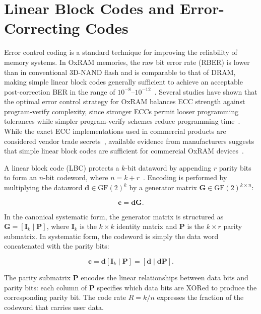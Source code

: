 \section{Linear Block Codes and Error-Correcting Codes}
\label{sec:bg-ecc}

Error control coding is a standard technique for improving the
reliability of memory systems. In OxRAM memories, the raw bit error rate
(RBER) is lower than in conventional 3D-NAND flash and is comparable to
that of DRAM, making simple linear block codes generally sufficient to
achieve an acceptable post-correction BER in the range of
$10^{-8}$--$10^{-12}$~\cite{patel2020bit}. Several studies have shown
that the optimal error control strategy for OxRAM balances ECC strength
against program-verify complexity, since stronger ECCs permit looser
programming tolerances while simpler program-verify schemes reduce
programming time~\cite{hayakawa2017resolving,
	fukuyama2019comprehensive}. While the exact ECC implementations used in
commercial products are considered vendor trade
secrets~\cite{patel2020bit}, available evidence from manufacturers
suggests that simple linear block codes are sufficient for commercial
OxRAM devices~\cite{hayakawa2017resolving}.

A linear block code (LBC) protects a $k$-bit dataword by appending $r$
parity bits to form an $n$-bit codeword, where $n = k +
	r$~\cite{hamming1950error, sklar2004abcs}. Encoding is performed by
multiplying the dataword $\mathbf{d} \in \mathrm{GF}(2)^k$ by a
generator matrix $\mathbf{G} \in \mathrm{GF}(2)^{k \times n}$:

\begin{equation}
	\label{eqn:codeword-gen}
	\mathbf{c} = \mathbf{d}\mathbf{G}.
\end{equation}

In the canonical systematic form, the generator matrix is structured as
$\mathbf{G} = [\mathbf{I}_k \mid \mathbf{P}]$, where $\mathbf{I}_k$ is
the $k \times k$ identity matrix and $\mathbf{P}$ is the $k \times r$
parity submatrix. In systematic form, the codeword is simply the data
word concatenated with the parity bits:

\begin{equation}
	\mathbf{c} = \mathbf{d}[\mathbf{I}_k \mid \mathbf{P}] = [\mathbf{d} \mid \mathbf{d}\mathbf{P}].
\end{equation}

The parity submatrix $\mathbf{P}$ encodes the linear relationships
between data bits and parity bits: each column of $\mathbf{P}$ specifies
which data bits are XORed to produce the corresponding parity bit. The
code rate $R = k/n$ expresses the fraction of the codeword that carries
user data.

